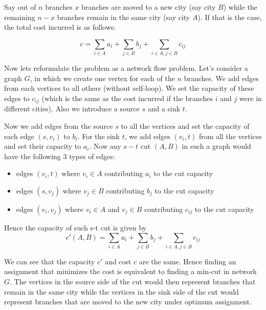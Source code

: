 Say out of $n$ branches $x$ branches are moved to a new city (say city $B$) while the remaining $n-x$ branches remain in the same city (say city $A$). If that is the case, the total cost incurred is as follows:

\[
  c = \sum\limits_{i \in A} a_i + \sum\limits_{j \in B} b_j + \sum\limits_{i \in A, j \in B} c_{ij}
\]

Now lets reformulate the problem as a network flow problem. Let's consider a graph $G$, in which we create one vertex for each of the  $n$ branches. We add edges from each vertices to all others (without self-loop). We set the capacity of these edges to $c_{ij}$ (which is the same as the cost incurred if the branches $i$ and $j$ were in different cities). Also we introduce a source $s$ and a sink $t$.

Now we add edges from the source $s$ to all the vertices and set the capacity of each edge $(s, v_i)$ to $b_i$. For the sink $t$, we add edges $(v_i, t)$ from all the vertices and set their capacity to $a_i$. Now any $s-t$ cut $(A, B)$ in such a graph would have the following 3 types of edges:

\begin{itemize}
\item edges $(v_i, t)$ where $v_i \in A$ contributing $a_i$ to the cut capacity
\item edges $(s, v_j)$ where $v_j \in B$ contributing $b_j$ to the cut capacity
\item edges $(v_i, v_j)$ where $v_i \in A$ and $v_j \in B$ contributing $c_{ij}$ to the cut capacity 
\end{itemize}

Hence the capacity of such s-t cut is given by \\

\[
  c'(A, B) = \sum\limits_{i \in A} a_i + \sum\limits_{j \in B} b_j + \sum\limits_{i \in A, j \in B} c_{ij}
\]



We can see that the capacity $c'$ and cost $c$ are the same. Hence finding an assignment that minimizes the cost is equivalent to finding a min-cut in network $G$. The vertices in the source side of the cut would then represent branches that remain in the same city while the vertices in the sink side of the cut would represent branches that are moved to the new city under optimum assignment.
